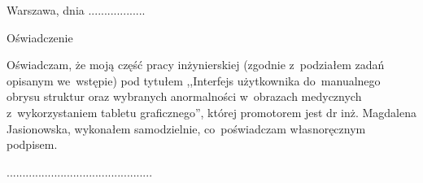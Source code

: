 \documentclass[a4paper,11pt,twoside,openright]{report}
\theoremstyle{definition}
\newcommand{\tytul}{Interfejs użytkownika do~manualnego obrysu struktur oraz wybranych anormalności w~obrazach medycznych z~wykorzystaniem tabletu graficznego}
\renewcommand{\title}{User interface for graphic-tablet interactions for contouring of~structures and selected anormalies in~medical images}
\newcommand{\type}{inżyniers} %
\newcommand{\supervisor}{dr inż. Magdalena Jasionowska}
\begin{document}
{
\begin{abstract}


Do nowego przetłumaczenia - Tomek.


\noindent \textbf{Keywords:} user interface, graphics tablet, medical images, DICOM, contour, statistics of~image data, IT~system, REST API interface, edge detection, contour generation
\end{abstract}
}




\null\thispagestyle{empty}\newpage

\null \hfill Warszawa, dnia ..................\\

\par\vspace{5cm}

\begin{center}
Oświadczenie
\end{center}

\indent Oświadczam, że moją część pracy \type kiej
(zgodnie z~podziałem zadań opisanym we~wstępie) pod
tytułem ,,\tytul '', której promotorem jest \supervisor , wykonałem
samodzielnie, co~poświadczam własnoręcznym podpisem.
\vspace{2cm}


\begin{flushright}
  \begin{minipage}{50mm}
    \begin{center}
      ..............................................

    \end{center}
  \end{minipage}
\end{flushright}
\end{document}
